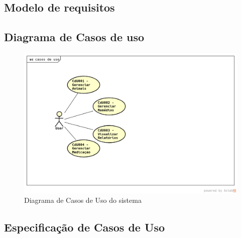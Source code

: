 \documentclass[12pt]{article}
\begin{document}
\begin{titlepage}
\section{Modelo de requisitos}

\subsection{Diagrama de Casos de uso}

\begin{figure}[!h]
\begin{center}
\caption{Diagrama de Casos de Uso do sistema}
\includegraphics[width=6in]{img/casosdeuso.png}

\end{center}
\end{figure}


\subsection{Especificação de Casos de Uso}


\end{titlepage}
\end{document}

